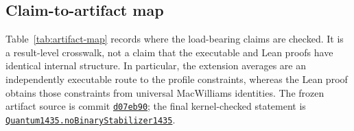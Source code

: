 \documentclass[11pt]{amsart}
\theoremstyle{definition}
\theoremstyle{remark}
\begin{document}
\subsection{Claim-to-artifact map}\label{subsec:artifact-map}
Table~\ref{tab:artifact-map} records where the load-bearing claims are checked.
It is a result-level crosswalk, not a claim that the executable and Lean proofs
have identical internal structure.  In particular, the extension averages are
an independently executable route to the profile constraints, whereas the Lean
proof obtains those constraints from universal MacWilliams identities.  The
frozen artifact source is commit
\href{https://github.com/Mansehej/quantum-14-3-5/tree/d07eb90f96d8ef96777fead7b2126dd2a836ec39}{\texttt{d07eb90}};
the final kernel-checked statement is
\href{https://github.com/Mansehej/quantum-14-3-5/blob/d07eb90f96d8ef96777fead7b2126dd2a836ec39/formal/Quantum1435/Final.lean#L35}{\texttt{Quantum1435.noBinaryStabilizer1435}}.
\end{document}
